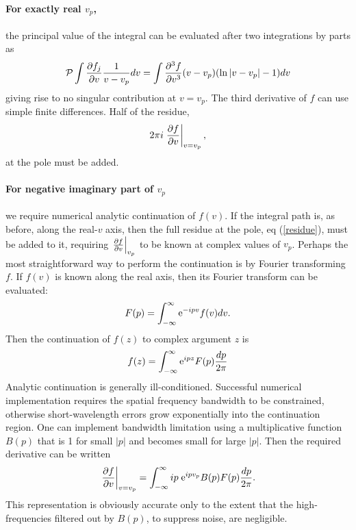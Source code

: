 \documentclass[12pt]{article}
\begin{document}
\paragraph{For exactly real $v_p$,} the principal value of the integral can be
evaluated after two integrations by parts as 
\begin{equation}
 {\cal P}\int  {\partial
    f_j\over \partial v } {1\over v- v_p} dv =
\int{\partial^3 f\over \partial v^3} 
(v-v_p) (\ln|v-v_p|-1) dv
\end{equation}
giving rise to no singular contribution at $v=v_p$. The third
derivative of $f$ can use simple finite differences. Half of the residue,
\begin{equation}\label{residue}
  2\pi i \left.\partial f\over \partial v\right|_{v=v_p} ,
\end{equation}
at the pole must be added.

\paragraph{For negative imaginary part of $v_p$}  we require numerical
analytic continuation of $f(v)$. If the integral path is, as before, along the
real-$v$ axis, then the full residue at the pole, eq (\ref{residue}),
must be added to it, requiring $\left.\partial f\over \partial
v\right|_{v_p}$ to be known at complex values of $v_p$.  Perhaps the
most straightforward way to perform the continuation is by Fourier
transforming $f$. If $f(v)$ is known along the real axis, then its
Fourier transform can be evaluated:
\begin{equation}
  F(p) = \int_{-\infty}^\infty {\rm e}^{-ipv} f(v) dv .
\end{equation}
Then the continuation of $f(z)$ to complex argument $z$ is
\begin{equation}
  f(z)= \int_{-\infty}^\infty  {\rm e}^{ipz} F(p) {dp\over 2\pi}
\end{equation}
Analytic continuation is generally ill-conditioned. Successful
numerical implementation requires the spatial frequency bandwidth to
be constrained, otherwise short-wavelength errors grow exponentially
into the continuation region. One can implement bandwidth limitation
using a multiplicative function $B(p)$ that is 1 for small $|p|$ and
becomes small for large $|p|$. Then the required derivative can be
written
\begin{equation}\label{inverse}
\left.\partial f\over \partial v\right|_{v=v_p} = 
\int_{-\infty}^\infty ip\;  {\rm e}^{ipv_p} B(p) F(p)
         {dp\over 2\pi} .
\end{equation}
This representation is obviously accurate only to the extent that the
high-frequencies filtered out by $B(p)$, to suppress noise, are negligible.
\end{document}
